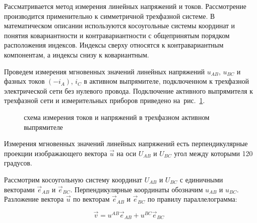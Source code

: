 Рассматривается метод измерения линейных напряжений и токов. Рассмотрение производится применительно к симметричной трехфазной системе.
В математическом описании используются косоугольные системы координат и понятия ковариантности и контравариантности с общепринятым порядком расположения индексов.
Индексы сверху относятся к контравариантным компонентам, а индексы снизу к  ковариантным. 

Проведем измерения мгновенных значений линейных напряжений $u_{\scriptscriptstyle AB}$,   $u_{\scriptscriptstyle BC}$ и фазных токов $(-i_{\scriptscriptstyle A})$, 
$i_{\scriptscriptstyle C}$ в активном выпрямителе, подключенном к трехфазной электрической сети без нулевого провода. Подключение активного выпрямителя к трехфазной сети и измерительных
приборов приведено на~рис.~\ref{inverter_grid_IV}.

\begin{figure}[!ht]
\centering

\caption{схема измерения токов и напряжений в трехфазном активном выпрямителе}
\label{inverter_grid_IV}
\end{figure}

Измерения мгновенных значений линейных напряжений есть перпендикулярные проекции изображающего вектора $\vec{u}$ на оси $U_{\scriptscriptstyle AB}$  и $U_{\scriptscriptstyle BC}$ угол 
между которыми 120 градусов.

Рассмотрим косоугольную систему координат  $U_{\scriptscriptstyle AB}$  и $U_{\scriptscriptstyle BC}$ с единичными векторами  $\vec{e}_{\scriptscriptstyle\!AB}$  и $\vec{e}_{\scriptscriptstyle\!BC}$.
Перпендикулярные координаты обозначим $u_{\scriptscriptstyle\!AB}$ и $u_{\scriptscriptstyle\!BC}$.
Разложение вектора $\vec{u}$ по векторам  $\vec{e}_{\scriptscriptstyle\!AB}$  и $\vec{e}_{\scriptscriptstyle\!BC}$ по правилу параллелограмма:

\begin{equation}
\vec{v} =  u^{\scriptscriptstyle\!AB} \vec{e}_{\scriptscriptstyle\!AB} + u^{\scriptscriptstyle\!BC} \vec{e}_{\scriptscriptstyle\!BC}
\label{vector_eq}
\end{equation}

